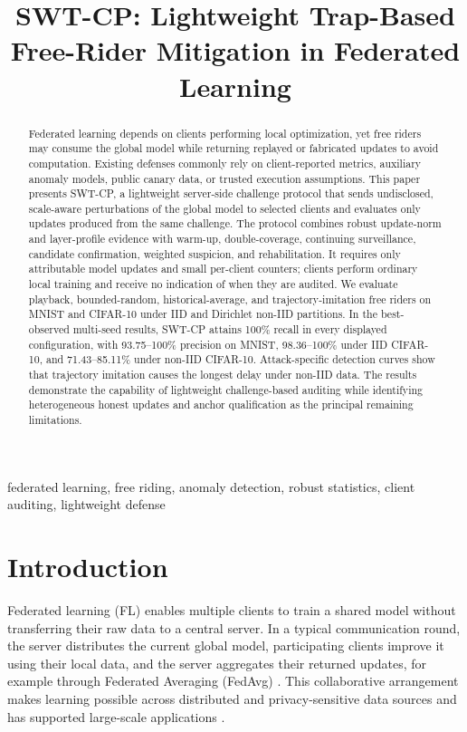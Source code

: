 \documentclass[conference]{IEEEtran}
\title{SWT-CP: Lightweight Trap-Based Free-Rider Mitigation in Federated Learning}
\author{\IEEEauthorblockN{Aashnan Rahman}
\IEEEauthorblockA{Department of Computer Science and Engineering\\
Islamic University of Technology\\Student ID: 231041006}}
\newcommand{\method}{SWT-CP}
\begin{document}
\maketitle

\begin{abstract}
Federated learning depends on clients performing local optimization, yet free riders may consume the global model while returning replayed or fabricated updates to avoid computation. Existing defenses commonly rely on client-reported metrics, auxiliary anomaly models, public canary data, or trusted execution assumptions. This paper presents \method, a lightweight server-side challenge protocol that sends undisclosed, scale-aware perturbations of the global model to selected clients and evaluates only updates produced from the same challenge. The protocol combines robust update-norm and layer-profile evidence with warm-up, double-coverage, continuing surveillance, candidate confirmation, weighted suspicion, and rehabilitation. It requires only attributable model updates and small per-client counters; clients perform ordinary local training and receive no indication of when they are audited. We evaluate playback, bounded-random, historical-average, and trajectory-imitation free riders on MNIST and CIFAR-10 under IID and Dirichlet non-IID partitions. In the best-observed multi-seed results, \method{} attains 100\% recall in every displayed configuration, with 93.75--100\% precision on MNIST, 98.36--100\% under IID CIFAR-10, and 71.43--85.11\% under non-IID CIFAR-10. Attack-specific detection curves show that trajectory imitation causes the longest delay under non-IID data. The results demonstrate the capability of lightweight challenge-based auditing while identifying heterogeneous honest updates and anchor qualification as the principal remaining limitations.
\end{abstract}

\begin{IEEEkeywords}
federated learning, free riding, anomaly detection, robust statistics, client auditing, lightweight defense
\end{IEEEkeywords}

\section{Introduction}
Federated learning (FL) enables multiple clients to train a shared model without transferring their raw data to a central server. In a typical communication round, the server distributes the current global model, participating clients improve it using their local data, and the server aggregates their returned updates, for example through Federated Averaging (FedAvg) \cite{mcmahan2017communication}. This collaborative arrangement makes learning possible across distributed and privacy-sensitive data sources and has supported large-scale applications \cite{bonawitz2019towards,hard2018federated}.
\end{document}
